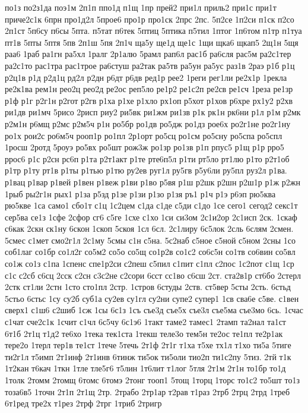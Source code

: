 {по1з
по2з1да
поэ1м
2п1п
ппо1д
п1щ
1пр
прей2
при1л
приль2
при1с
при1т
приче2с1к
6прн
про1д2л
5прое6
про1р
про1ск
2прс
2пс.
5п2се
1п2си
п1ск
п2со
2п1ст
5п6су
п6сы
5пта.
п5тат
п6тек
5птиц
5птика
п5тил
1птог
1п6том
п1тр
п1туа
пт1в
5пты
5птя
5пв
2п1ш
5пя
2п1ч
ща5у
ще1д
ще1с
1щи
щка6
щкап5
2щ1н
5щя
раа6
1раб
ра1гн
ра5хл
1ралг
2р1алю
5рамл
рап6л
рас1б
ра6сля
рас5м
ра2с1тер
ра2с1то
рас1тра
рас1трое
ра6стуш
ра2так
ра5тв
ра5ун
ра5ус
раз1в
2раэ
р1б
р1ц
р2ц1в
р1д
р2д1ц
рд2л
р2дн
р6дт
р6дв
ред1р
рее2
1реги
рег1ли
ре2х1р
1рекла
ре2к1ва
рем1н
рео2ц
рео2д
ре2ос
реп5ло
ре1р2
ре1с2п
ре2св
ре1сч
1реза
ре1зр
р1ф
р1г
р2г1н
р2гот
р2гв
р1ха
р1хе
р1хло
рх1оп
р5хот
р1хов
р6хре
рх1у2
р2хв
ри1дв
ри1мч
5рисо
2рисп
риу2
ри5вк
ри1жм
ри1зв
р1к
рк1н
рк6ни
р1л
р1м
р2мк
р2м1н
р6мщ
р2мс
р2м5ч
р1н
ро5бр
ро1дв
ро5дж
ро1дз
рое6х
ро2г1не
ро2г1ну
ро1х
рои2с
ро6м5ч
рооп1р
ро1пл
2р1орт
ро5сц
ро1см
ро5сну
ро5спа
ро5спл
1росш
2ротд
5роуэ
ро5вх
ро5шт
рож3ж
ро1зр
ро1зв
р1п
рпус5
р1щ
р1р
рро5
ррос6
р1с
р2сн
рс6п
р1та
р2т1акт
р1те
рте6п5л
р1ти
рт5ло
рт1лю
р1то
р2т1об
р1тр
р1ту
рт1в
р1ты
р1тью
р1тю
ру2ев
руг1л
ру5гв
р5у6ли
ру5пл
руз2л
р1ва.
р1вац
р1вар
р1вей
р1вен
р1веж
р1ви
р1во
р5вя
р1ш
р2шк
р2шн
р2ш1р
р1ж
р2жн
1рыб
ры2г1н
рых1
р1за
р5зд
р1зе
р1зи
р1зо
р1зя
ръ1
р1ч
р1э
р6эп
рю5ква
рю5кве
1са
само1
сбо1т
с1ц
1с2цем
с1да
с1де
с5ди
с1до
1се
сего1
сегод2
секс1т
сер5ва
се1з
1сфе
2сфор
сг6
с5ге
1схе
с1хо
1си
си3ом
2с1и2ор
2с1исп
2ск.
1скаф
с6как
2скн
ск1ну
6скон
1скоп
5скоя
1сл
6сл.
2с1лиру
6с5лок
2сль
6слям
2смен.
5смес
с1мет
смо2г1л
2с1му
5смы
с1н
с5на.
5с2наб
с5ное
с5ной
с5ном
2сны
1со
соб1лаг
со1бр
со1л2г
со5м2
со5о
со5щ
со1р2в
со1с2
со6с5н
со1тв
со6вин
со5вл
со1ж
со1з
с1па
1спенс
спе1р2си
с2пеш
с5пил
с1пит
с1пл
с2пос
1с2пот
с1щ
1ср
с1с
с2сб
с6сц
2сск
с2сн
с3с2не
с2сори
6сст
сс1во
с6сш
2ст.
ста2в1р
ст6бо
2стерл
2стк
ст1ли
2стн
1сто
сто1пл
2стр.
1стров
6студы
2ств.
ст5вер
5сты
2сть.
6стьд
5стьо
6стьс
1су
су2б
суб1а
су2ев
су1гл
су2ни
супе2
супер1
1св
сва6е
с5ве.
с1вен
сверх1
с1ш6
с2шиб
1сж
1сы
6с1з
1съ
съе3д
съе5х
съе3л
съе5ма
съе3мо
6сь.
1счас
с1чат
сче2с1к
1счит
с1чл
6с5чу
6с1э6
1такт
таме2
тамес1
2тамп
та2нал
та1ст
6т1б
2т1ц
т1д2
те6хо
1тека
тек1ста
1текш
теле3о
тем5н
те2ос
те1пл
те2р1ак
тере2о
1терл
тер1в
те1ст
1тече
5течь
2т1ф
2т1г
т1ха
т5хе
тх1л
т1хо
ти5а
5тиге
ти2г1л
т5имп
2т1инф
2т1инв
6тинж
ти5ок
ти5оли
тио2п
ти1с2пу
5тиз.
2тй
т1к
1т2кан
т6кач
1ткн
1тле
тле5г6
т5лин
1т6лит
т1лог
5тля
2т1м
2т1н
то1бр
то1д
1толк
2томм
2томщ
6томс
6томэ
2тонг
тооп1
5тощ
1торц
1торс
то1с2
то5шт
то1з
тоза6в5
1точн
2т1п
2т1щ
2тр.
2трабо
2тр1ар
т2рав
т1раз
2трб
2трц
2трд
1треб
6т1ред
тре2х
т1рез
2трф
2трг
1триб
2тригр
}
